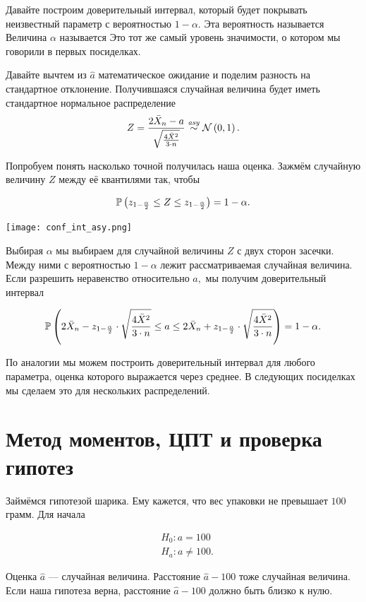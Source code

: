 \documentclass[12pt, a4paper, oneside]{article}
\begin{document}
\begin{sol}
Давайте построим доверительный интервал, который будет покрывать неизвестный параметр с вероятностью $1 - \alpha.$ Эта вероятность называется  Величина $\alpha$ называется  Это тот же самый уровень значимости, о котором мы говорили в первых посиделках. 

Давайте вычтем из $\hat a$ математическое ожидание и поделим разность на стандартное отклонение. Получившаяся случайная величина будет иметь стандартное нормальное распределение
\[
Z = \frac{ 2 \bar{X}_{n} - a}{\sqrt{\frac{4 \bar{X}^2}{3 \cdot n}} } \overset{\text{\textit{asy}}}{\sim} \mathcal{N} \left(0, 1 \right).
\] 

Попробуем понять насколько точной получилась наша оценка. Зажмём случайную величину $Z$ между её квантилями так, чтобы 

\[
\mathbb{P} \left( z_{1 - \frac{\alpha}{2}} \le Z \le z_{1 - \frac{\alpha}{2}} \right) = 1 - \alpha.
\]

\begin{center} 
    \texttt{[image: conf\_int\_asy.png]}
\end{center} 

Выбирая $\alpha$ мы выбираем для случайной величины $Z$ с двух сторон засечки. Между ними с вероятностью $1 - \alpha$ лежит рассматриваемая случайная величина. Если разрешить неравенство относительно $a,$ мы получим доверительный интервал 

$$
\mathbb{P}\left(2 \bar{X}_{n}  - z_{1 - \frac{\alpha}{2}} \cdot \sqrt{\frac{4 \bar{X}^2}{3 \cdot n}}  \le a \le 2 \bar{X}_{n}  + z_{1 - \frac{\alpha}{2}} \cdot \sqrt{\frac{4 \bar{X}^2}{3 \cdot n}} \right) = 1 - \alpha.
$$

По аналогии мы можем построить доверительный интервал для любого параметра, оценка которого выражается через среднее. В следующих посиделках мы сделаем это для нескольких распределений. 
\end{sol}


\section{Метод моментов, ЦПТ и проверка гипотез}

Займёмся гипотезой шарика. Ему кажется, что вес упаковки не превышает $100$ грамм. Для начала 

\begin{equation*} 
\begin{aligned} 
& H_0: a = 100 \\
& H_a: a \ne 100.
\end{aligned} 
\end{equation*} 

Оценка $\hat a$ --- случайная величина. Расстояние $\hat a - 100$ тоже случайная величина. Если наша гипотеза верна, расстояние $\hat a - 100$ должно быть близко к нулю. 

\end{document}
